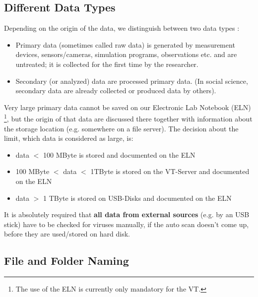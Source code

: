 \subsection{Different Data Types}
Depending on the origin of the data, we distinguish between two data types \cite{gitelman2013}:
\begin{itemize}
  \item Primary data (sometimes called raw data) is generated by measurement
        devices, sensors/cameras, simulation programs, observations etc. and
        are untreated; it is collected for the first time by the researcher.
  \item Secondary (or analyzed) data are processed primary data. (In social
        science, secondary data are already collected or produced data by
        others).
\end{itemize}
Very large primary data cannot be saved on our Electronic Lab Notebook (ELN)%
\footnote{The use of the ELN is currently only
mandatory for the VT. },
but the origin of that data are discussed there together with information about
the storage location (e.g. somewhere on a file server). The decision about the
limit, which data is considered as large, is:
\begin{itemize}
  \item data $<$ 100 MByte is stored and documented on the ELN
  \item 100 MByte  $<$ data $<$ 1TByte is stored on the VT-Server and documented
        on the ELN
  \item data $>$ 1 TByte is stored on USB-Disks and documented on the ELN
\end{itemize}
It is absolutely required that \textbf{all data from external sources} (e.g. by an USB
stick) have to be checked for viruses manually, if the auto scan doesn’t come
up, before they are used/stored on hard disk.

\subsection{File and Folder Naming}

